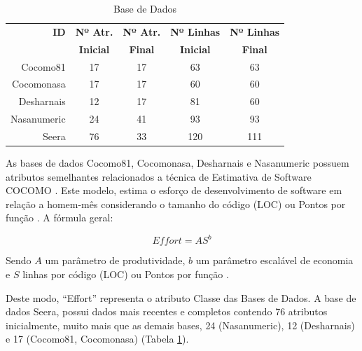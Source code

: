 \documentclass[12pt]{article}
\begin{document}
\begin{table}[h!]
  \begin{center}
    \caption{Base de Dados}
    \label{tab_bases}
    \begin{tabular}{r|c|c|c|c}
      \textbf{ID} & \textbf{Nº Atr.} & \textbf{Nº Atr.} & \textbf{Nº Linhas} & \textbf{Nº Linhas} \\
      \textbf{}   & \textbf{Inicial} & \textbf{Final}   & \textbf{ Inicial}  & \textbf{Final}     \\
      \hline
      Cocomo81    & 17               & 17               & 63                 & 63                 \\
      Cocomonasa  & 17               & 17               & 60                 & 60                 \\
      Desharnais  & 12               & 17               & 81                 & 60                 \\
      Nasanumeric & 24               & 41               & 93                 & 93                 \\
      Seera       & 76               & 33               & 120                & 111                \\
    \end{tabular}
  \end{center}
\end{table}

As bases de dados Cocomo81, Cocomonasa, Desharnais e Nasanumeric possuem atributos semelhantes relacionados a técnica de Estimativa de Software COCOMO \cite{boehm:1981}. Este modelo, estima o esforço de desenvolvimento de software em relação a homem-mês considerando o tamanho do código (LOC) ou Pontos por função \cite{banimustafa:2018}. A fórmula geral:

\begin{equation}
  Effort = A S^b
\end{equation}

Sendo $A$ um parâmetro de produtividade, $b$ um parâmetro escalável de economia e $S$ linhas por código (LOC) ou Pontos por função \cite{shepperd:1997}.

Deste modo, ``Effort'' representa o atributo Classe das Bases de Dados. A base de dados Seera, possui dados mais recentes e completos contendo 76 atributos inicialmente, muito mais que as demais bases, 24 (Nasanumeric), 12 (Desharnais) e 17 (Cocomo81, Cocomonasa) (Tabela \ref{tab_bases}).
\end{document}
